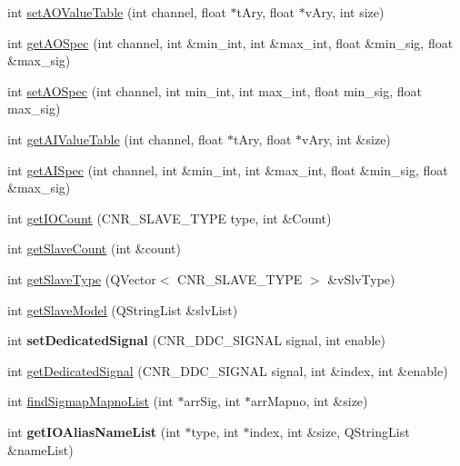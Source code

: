 \begin{DoxyCompactItemize}
\item 
int \hyperlink{classCNRobo_adf0b1ef015766039b27d0bcf9c057885}{set\-A\-O\-Value\-Table} (int channel, float $\ast$t\-Ary, float $\ast$v\-Ary, int size)
\item 
int \hyperlink{classCNRobo_aedf2e4cbe9efcb5addee9712ac4c74c7}{get\-A\-O\-Spec} (int channel, int \&min\-\_\-int, int \&max\-\_\-int, float \&min\-\_\-sig, float \&max\-\_\-sig)
\item 
int \hyperlink{classCNRobo_a71991ad7f3eae2fa899f985f99581064}{set\-A\-O\-Spec} (int channel, int min\-\_\-int, int max\-\_\-int, float min\-\_\-sig, float max\-\_\-sig)
\item 
int \hyperlink{classCNRobo_a8e3893b2b3eaea01ef91981d80c68d11}{get\-A\-I\-Value\-Table} (int channel, float $\ast$t\-Ary, float $\ast$v\-Ary, int \&size)
\item 
int \hyperlink{classCNRobo_abc1565bca0de5f2d3770b5669200c7e1}{get\-A\-I\-Spec} (int channel, int \&min\-\_\-int, int \&max\-\_\-int, float \&min\-\_\-sig, float \&max\-\_\-sig)
\item 
int \hyperlink{classCNRobo_a493d560e5143f80634a59eba60f0eca4}{get\-I\-O\-Count} (C\-N\-R\-\_\-\-S\-L\-A\-V\-E\-\_\-\-T\-Y\-P\-E type, int \&Count)
\item 
int \hyperlink{classCNRobo_a20c55ae3b687cfb6cc42d61821629b92}{get\-Slave\-Count} (int \&count)
\item 
int \hyperlink{classCNRobo_aee441334172158a8e59dc6e7c53f03d0}{get\-Slave\-Type} (Q\-Vector$<$ C\-N\-R\-\_\-\-S\-L\-A\-V\-E\-\_\-\-T\-Y\-P\-E $>$ \&v\-Slv\-Type)
\item 
int \hyperlink{classCNRobo_a63377926b063af42ff9d4ddd4a92b5bc}{get\-Slave\-Model} (Q\-String\-List \&slv\-List)
\item 
\hypertarget{classCNRobo_a280629c645b5209aa6e9f8898ef6382f}{int {\bfseries set\-Dedicated\-Signal} (C\-N\-R\-\_\-\-D\-D\-C\-\_\-\-S\-I\-G\-N\-A\-L signal, int enable)}\label{classCNRobo_a280629c645b5209aa6e9f8898ef6382f}

\item 
int \hyperlink{classCNRobo_a614d9fecc81f833b7a77a8edaece0984}{get\-Dedicated\-Signal} (C\-N\-R\-\_\-\-D\-D\-C\-\_\-\-S\-I\-G\-N\-A\-L signal, int \&index, int \&enable)
\item 
int \hyperlink{classCNRobo_a58ac7c790aeeef7e5bfcc5cb25834d44}{find\-Sigmap\-Mapno\-List} (int $\ast$arr\-Sig, int $\ast$arr\-Mapno, int \&size)
\item 
\hypertarget{classCNRobo_a47aaa9b1ae89f6fa01f83893c4d0de8c}{int {\bfseries get\-I\-O\-Alias\-Name\-List} (int $\ast$type, int $\ast$index, int \&size, Q\-String\-List \&name\-List)}\label{classCNRobo_a47aaa9b1ae89f6fa01f83893c4d0de8c}


\end{DoxyCompactItemize}

